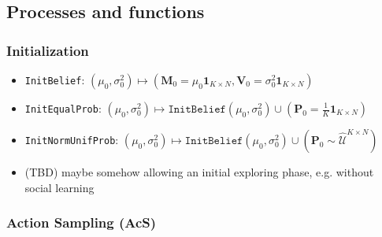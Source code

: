 \documentclass[fleqn]{article}
\begin{document}
\subsection*{Processes and functions}

\subsubsection*{Initialization}

\begin{itemize}
    \item \texttt{InitBelief}: $
        \left(
            \mu_0,
            \sigma^2_0
        \right)
        \longmapsto
        \left(
            \mathbf{M}_0 = \mu_0       \mathbf{1}_{K \times N},
            \mathbf{V}_0 = \sigma^2_0  \mathbf{1}_{K \times N}
        \right)
        $
    \item \texttt{InitEqualProb}: $
        \left(
            \mu_0,
            \sigma^2_0
        \right)
        \longmapsto
        \texttt{InitBelief}\left(\mu_0,\sigma^2_0\right)
        \cup
        \left(
            \mathbf{P}_0 = \frac{1}{K} \mathbf{1}_{K \times N}
        \right)
        $
    \item \texttt{InitNormUnifProb}: $
        \left(
            \mu_0,
            \sigma^2_0
        \right)
        \longmapsto
        \texttt{InitBelief}\left(\mu_0,\sigma^2_0\right)
        \cup
        \left(
            \mathbf{P}_0 \sim \widehat{\mathcal{U}}^{K \times N}
        \right)
        $
    \item (TBD) maybe somehow allowing an initial exploring phase, e.g. without social learning
\end{itemize}

\subsubsection*{Action Sampling (AcS)}
\end{document}
